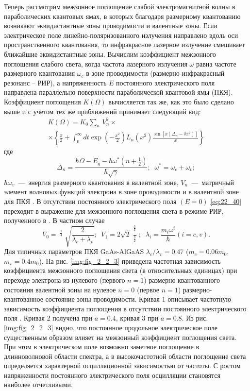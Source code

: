 Теперь рассмотрим межзонное поглощение слабой электромагнитной волны в параболических квантовых ямах, в которых благодаря размерному квантованию возникают эквидистантные зоны проводимости и валентные зоны. Если электрическое поле линейно-поляризованного излучения направлено вдоль оси пространственного квантования, то инфракрасное лазерное излучение смешивает ближайшие эквидистантные зоны. Вычислим коэффициент межзонного поглощения слабого света, когда частота лазерного излучения $\omega $ равна частоте размерного квантования $\omega _{c} $ в зоне проводимости (размерно-инфракрасный резонанс -- РИР), а напряженность $E$ постоянного электрического поля направлена параллельно поверхности параболической квантовой ямы (ПКЯ). Коэффициент поглощения $K(\Omega )$ вычисляется так же, как это было сделано выше и с учетом тех же приближений принимает следующий вид: 
\begin{multline} \label{eq:22_40} 
K(\Omega )=K_{0} \sum _{n} \, V_{n}^{2} \times  \\
\times \left\{\frac{\pi }{2} +\int _{0}^{\infty } dt \exp \left(-\frac{x^{2} }{2} \right)L_{n} \left(x^{2} \right)\frac{\sin \left[x\left(\Delta _{n} -\delta x^{2} \right)\right]}{x} \right\}
\end{multline} 
где 
\[\Delta _{n} =\frac{\hbar \Omega -E_{g} -\hbar \omega ^{*} \left(n+{\tfrac{1}{2}} \right)}{\hbar \sqrt{\gamma } } ;\; \; \omega ^{*} =\omega _{c} +\omega _{v} ;\] 
$\hbar \omega _{v} $~---~энергия размерного квантования в валентной зоне, $V_{n} $~---~матричный элемент волновых функций электрона в зоне проводимости и в валентной зоне для ПКЯ \cite{Sinyavskii2002}. В отсутствии постоянного электрического поля $(E=0)$ \eqref{eq:22_40} переходит в выражение для межзонного поглощения света в режиме РИР, полученного в \cite{Sinyavskii2002}. В частном случае 
\[V_{0} =\mathop{\left(\lambda _{c} \lambda _{v} \right)}\nolimits^{{\tfrac{1}{4}} } \sqrt{\frac{2}{\lambda _{c} +\lambda _{v} } } ;\; \; V_{1} =2\sqrt{2} \frac{\mathop{\left(\lambda _{c} \lambda _{v} \right)}\nolimits^{{\tfrac{3}{4}} } }{\mathop{\left(\lambda _{c} +\lambda _{v} \right)}\nolimits^{{\tfrac{3}{2}} } } ;\; \; \lambda _{i} =\frac{m_{i} \omega ^{i} }{\hbar } (i=c,v).\] 
Для типичных параметров ПКЯ GaAs-AlGaAS $\lambda _{c} /\lambda _{v} =0.47$ ($m_{c} =0.06m_{0} ,$ $m_{v} =0.4m_{0} $). На рис. \ref{img:fig_2_2_3} приведена частотная зависимость коэффициента межзонного поглощения света (в относительных единицах) при переходе электрона из нулевого (первого $n=1$) размерно-квантованного состояния валентной зоны на нулевое $n=0$ (первое $n=1$) размерно-квантованное состояние зоны проводимости. Кривая 1 описывает частотную зависимость коэффициента поглощения в отсутствии постоянного электрического поля \cite{Sinyavskii2002}. Кривая 2 получена при $a=0.4$, кривая 3 при $a=0.8$. Из рис. \ref{img:fig_2_2_3} видно, что постоянное продольное электрическое поле существенным образом влияет на межзонный коэффициент поглощения света. При этом в электрическом поле возможно заметное поглощение в длинноволновой области спектра, а в высокочастотной области поглощение света определяется характерной осцилляционной зависимостью от частоты. С ростом напряженности постоянного электрического поля осцилляции становятся наиболее отчетливыми. 
